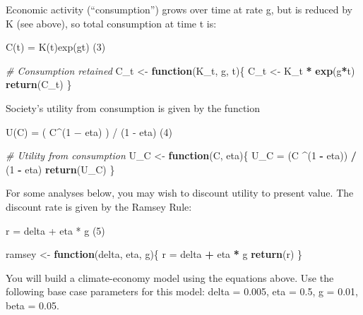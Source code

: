 \documentclass[]{article}
\newenvironment{Shaded}{\begin{snugshade}}{\end{snugshade}}
\newcommand{\CommentTok}[1]{\textcolor[rgb]{0.56,0.35,0.01}{\textit{#1}}}
\newcommand{\ControlFlowTok}[1]{\textcolor[rgb]{0.13,0.29,0.53}{\textbf{#1}}}
\newcommand{\DecValTok}[1]{\textcolor[rgb]{0.00,0.00,0.81}{#1}}
\newcommand{\KeywordTok}[1]{\textcolor[rgb]{0.13,0.29,0.53}{\textbf{#1}}}
\newcommand{\NormalTok}[1]{#1}
\newcommand{\OperatorTok}[1]{\textcolor[rgb]{0.81,0.36,0.00}{\textbf{#1}}}
\newcommand{\StringTok}[1]{\textcolor[rgb]{0.31,0.60,0.02}{#1}}
\begin{document}
Economic activity (``consumption'') grows over time at rate g, but is
reduced by K (see above), so total consumption at time t is:

C(t) = K(t)exp(gt) (3)

\begin{Shaded}
\begin{Highlighting}[]
\CommentTok{# Consumption retained}
\NormalTok{C_t <-}\StringTok{ }\ControlFlowTok{function}\NormalTok{(K_t, g, t)\{}
\NormalTok{  C_t <-}\StringTok{ }\NormalTok{K_t }\OperatorTok{*}\StringTok{ }\KeywordTok{exp}\NormalTok{(g}\OperatorTok{*}\NormalTok{t)}
  \KeywordTok{return}\NormalTok{(C_t)}
\NormalTok{\}}
\end{Highlighting}
\end{Shaded}

Society's utility from consumption is given by the function

U(C) = ( C\^{}(1 − eta) ) / (1 - eta) (4)

\begin{Shaded}
\begin{Highlighting}[]
\CommentTok{# Utility from consumption}
\NormalTok{U_C <-}\StringTok{ }\ControlFlowTok{function}\NormalTok{(C, eta)\{}
\NormalTok{  U_C =}\StringTok{ }\NormalTok{(C }\OperatorTok{^}\NormalTok{(}\DecValTok{1} \OperatorTok{-}\StringTok{ }\NormalTok{eta)) }\OperatorTok{/}\StringTok{ }\NormalTok{(}\DecValTok{1} \OperatorTok{-}\StringTok{ }\NormalTok{eta)}
  \KeywordTok{return}\NormalTok{(U_C)}
\NormalTok{\}}
\end{Highlighting}
\end{Shaded}

For some analyses below, you may wish to discount utility to present
value. The discount rate is given by the Ramsey Rule:

r = delta + eta * g (5)

\begin{Shaded}
\begin{Highlighting}[]
\NormalTok{ramsey <-}\StringTok{ }\ControlFlowTok{function}\NormalTok{(delta, eta, g)\{}
\NormalTok{  r =}\StringTok{ }\NormalTok{delta }\OperatorTok{+}\StringTok{ }\NormalTok{eta }\OperatorTok{*}\StringTok{ }\NormalTok{g}
  \KeywordTok{return}\NormalTok{(r)}
\NormalTok{\}}
\end{Highlighting}
\end{Shaded}

You will build a climate-economy model using the equations above. Use
the following base case parameters for this model: delta = 0.005, eta =
0.5, g = 0.01, beta = 0.05.
\end{document}
